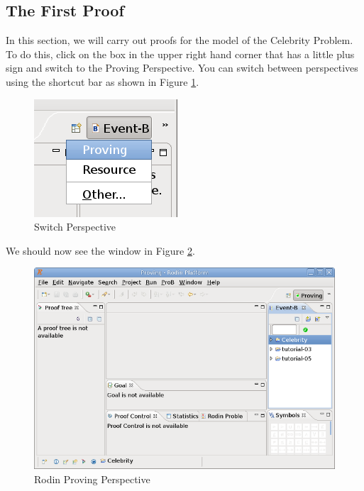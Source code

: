 \subsection{The First Proof}
\label{tut_first_proof}

In this section, we will carry out proofs for the model of the Celebrity Problem. To do this, click on the box in the upper right hand corner that has a little plus sign and switch to the Proving Perspective. You can switch between perspectives using the shortcut bar as shown in Figure \ref{fig_tut_08_switch_perspective}. 

\begin{figure}[!ht]
\begin{center}
	\includegraphics{img/tutorial/tut_08_switch_perspective.png}
	\caption{Switch Perspective}
	\label{fig_tut_08_switch_perspective}
\end{center}
\end{figure}


We should now see the window in Figure \ref{fig_tut_08_proving_perspective}. 

\begin{figure}[!ht]
\begin{center}
	\includegraphics{img/tutorial/tut_08_proving_perspective.png}
	\caption{Rodin Proving Perspective}
	\label{fig_tut_08_proving_perspective}
\end{center}
\end{figure}

